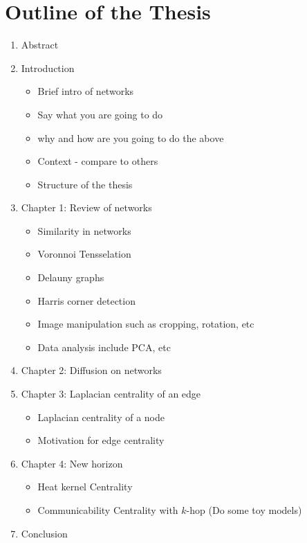 \documentclass[10pt,a4paper]{article}
\begin{document}
    \newpage
	\section*{Outline of the Thesis}
	\begin{enumerate}
		\item Abstract
		\item Introduction
		\begin{itemize}
			\item Brief intro of networks
			\item Say what you are going to do
			\item why and how are you going to do the above 
			\item Context - compare to others
			\item Structure of the thesis
		\end{itemize}
	    \item Chapter 1: Review of networks
	     \begin{itemize}
	     	\item Similarity in networks
	     	\item Voronnoi Tensselation
	     	\item Delauny graphs
	     	\item Harris corner detection
	     	\item Image manipulation such as cropping, rotation, etc
	     	\item Data analysis include PCA, etc
	     \end{itemize}
        \item Chapter 2: Diffusion on networks
        \item Chapter 3: Laplacian centrality of an edge
        \begin{itemize}
        	\item Laplacian centrality of a node
        	\item Motivation for edge centrality
        \end{itemize}
        \item Chapter 4: New horizon
        \begin{itemize}
        	\item Heat kernel Centrality
        	\item Communicability Centrality with $k$-hop (Do some toy models)
        \end{itemize}
        \item Conclusion
	\end{enumerate}
	
\end{document}
